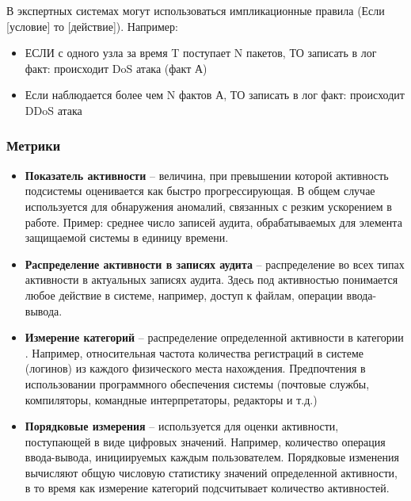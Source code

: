 В экспертных системах могут использоваться импликационные правила (Если [условие] то [действие]). 
Например:
\begin{itemize}
	\item ЕСЛИ с одного узла за время T поступает N пакетов, ТО записать в лог факт: 
	происходит DoS атака (факт А)
	
	\item Если наблюдается более чем N фактов А, ТО записать в лог факт: происходит DDoS атака
\end{itemize}



\subsubsection{Метрики}

\begin{itemize}
	\item \textbf{Показатель активности} -- величина, при превышении которой активность 
	подсистемы оценивается как быстро прогрессирующая. В общем случае используется для 
	обнаружения аномалий, связанных с резким ускорением в работе. Пример: среднее число 
	записей аудита, обрабатываемых для элемента защищаемой системы в единицу времени.

	\item \textbf{Распределение активности в записях аудита} -- распределение во всех типах 
	активности в актуальных записях аудита. Здесь под активностью понимается любое действие 
	в системе, например, доступ к файлам, операции ввода-вывода.

	\item \textbf{Измерение категорий} -- распределение определенной активности в 
	категории \footnotemark. Например, относительная частота количества регистраций в 
	системе (логинов) из каждого физического места нахождения. Предпочтения в использовании 
	программного обеспечения системы (почтовые службы, компиляторы, командные интерпретаторы, 
	редакторы и т.д.)

	\item \textbf{Порядковые измерения} -- используется для оценки активности, поступающей 
	в виде цифровых значений. Например, количество операция ввода-вывода, инициируемых каждым 
	пользователем. Порядковые изменения вычисляют общую числовую статистику значений определенной 
	активности, в то время как измерение категорий подсчитывает количество активностей.
\end{itemize}




